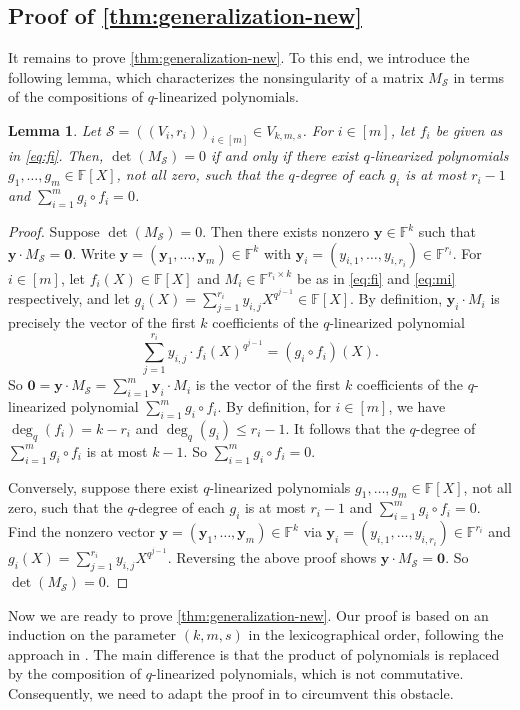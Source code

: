\documentclass[11pt]{article}
\theoremstyle{plain}
\newtheorem{lemma}[thm]{Lemma}
\theoremstyle{definition}
\theoremstyle{remark}
\newcommand{\F}{\mathbb{F}}
\newcommand{\cS}{\mathcal{S}}
\newcommand{\by}{\bm{y}}
\begin{document}
\subsection{Proof of \cref{thm:generalization-new}}

It remains to prove \cref{thm:generalization-new}.
To this end, we introduce the following lemma, which characterizes the nonsingularity of a matrix $M_{\cS}$ in terms of the compositions of $q$-linearized polynomials.

\begin{lemma}\label{lm:equivalent-new}
Let $\cS=((V_i,r_i))_{i\in [m]}\in V_{k,m,s}$.
For $i\in [m]$, let $f_i$ be given as in \eqref{eq:fi}.
Then, $\det(M_{\cS})=0$ if and only if there exist $q$-linearized polynomials $g_1,\ldots,g_m\in \F[X]$, not all zero, such that the $q$-degree of each $g_i$ is at most $r_i-1$ and $\sum_{i=1}^m g_i\circ f_i=0$. 
\end{lemma}
\begin{proof}
Suppose $\det(M_{\cS})=0$. Then there exists nonzero $\by\in \mathbb{F}^{k}$ such that $\by\cdot M_{\cS}=\mathbf{0}$.
Write $\by=(\by_1,\ldots,\by_m)\in\F^k$ with $\by_i=(y_{i,1},\ldots,y_{i,r_i})\in \mathbb{F}^{r_i}$. 
For $i\in [m]$, let $f_i(X)\in \F[X]$ and $M_i\in\F^{r_i\times k}$ be as in \eqref{eq:fi} and \eqref{eq:mi} respectively, and let $g_i(X)=\sum_{j=1}^{r_i}y_{i,j}X^{q^{j-1}}\in\F[X]$.
By definition, $\by_i \cdot M_i$ is precisely
the vector of the first $k$ coefficients of the $q$-linearized polynomial
\[
\sum_{j=1}^{r_i} y_{i,j} \cdot f_i(X)^{q^{j-1}}=(g_i\circ f_i)(X).
\]
So $\mathbf{0}=\by\cdot M_{\cS}=\sum_{i=1}^m \by_i\cdot M_i$ is the vector of the first $k$ coefficients of the $q$-linearized polynomial $\sum_{i=1}^m g_i\circ f_i$. By definition, for $i\in [m]$, we have $\deg_q(f_i)=k-r_i$ and $\deg_q(g_i)\leq r_i-1$. It follows that the $q$-degree of $\sum_{i=1}^m g_i\circ f_i$ is at most $k-1$. So $\sum_{i=1}^m g_i\circ f_i=0$. 

Conversely, suppose there exist $q$-linearized polynomials $g_1,\ldots,g_m\in \F[X]$, not all zero, such that the $q$-degree of each $g_i$ is at most $r_i-1$ and $\sum_{i=1}^m g_i\circ f_i=0$. Find the nonzero vector $\by=(\by_1,\ldots,\by_m)\in\F^k$ via $\by_i=(y_{i,1},\ldots,y_{i,r_i})\in \mathbb{F}^{r_i}$ and $g_i(X)=\sum_{j=1}^{r_i}y_{i,j}X^{q^{j-1}}$. Reversing the above proof shows $\by\cdot M_{\cS}=\mathbf{0}$. So $\det(M_{\cS})=0$.
\end{proof}

Now we are ready to prove \cref{thm:generalization-new}. Our proof is based on an induction on the parameter $(k,m,s)$ in the lexicographical order, following the approach in \cite{yildiz2019optimum}. The main difference is that the product of polynomials is replaced by the composition of $q$-linearized polynomials, which is not commutative. Consequently, we need to adapt the proof in \cite{yildiz2019optimum} to circumvent this obstacle. 
\end{document}
